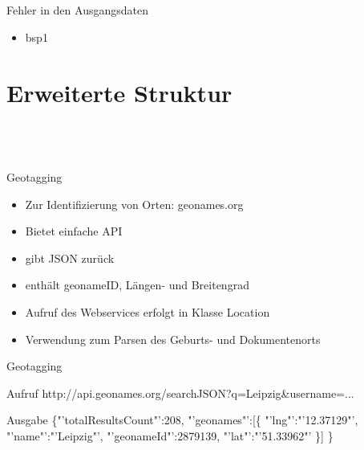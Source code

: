 \documentclass[12pt]{beamer}
\begin{document}
\begin{large}
 \subsection*{~}
\begin{frame}{Fehler in den Ausgangsdaten}
 \begin{itemize}
  \item bsp1
 \end{itemize}
\end{frame}

\section{Erweiterte Struktur}
 \subsection*{~}

\begin{frame}{Geotagging}
\begin{itemize}
  \item Zur Identifizierung von Orten: geonames.org
  \item Bietet einfache API
  \item gibt JSON zurück
  \item enthält geonameID, Längen- und Breitengrad
  \item Aufruf des Webservices erfolgt in Klasse Location
  \item Verwendung zum Parsen des Geburts- und Dokumentenorts
 \end{itemize}
\end{frame}
 
\begin{frame}{Geotagging}
 \vspace*{\fill}
 \begin{block}{Aufruf}
 \normalsize http://api.geonames.org/searchJSON?q=Leipzig\&username=...
 \end{block}
 
 \begin{block}{Ausgabe}
 \normalsize \{"'totalResultsCount"':208,
  \newline
  \hspace*{0.5cm}"'geonames"':[\{
  \newline
  \hspace*{1cm}"'lng"':"'12.37129"',
  \newline
  \hspace*{1cm}"'name"':"'Leipzig"',
  \newline  
  \hspace*{1cm}"'geonameId"':2879139,
  \newline
  \hspace*{1cm}"'lat"':"'51.33962"'
  \newline
  \hspace*{0.5cm}\}]
  \newline
  \}
 \end{block}
\end{frame} 
 

\end{large}
\end{document}
